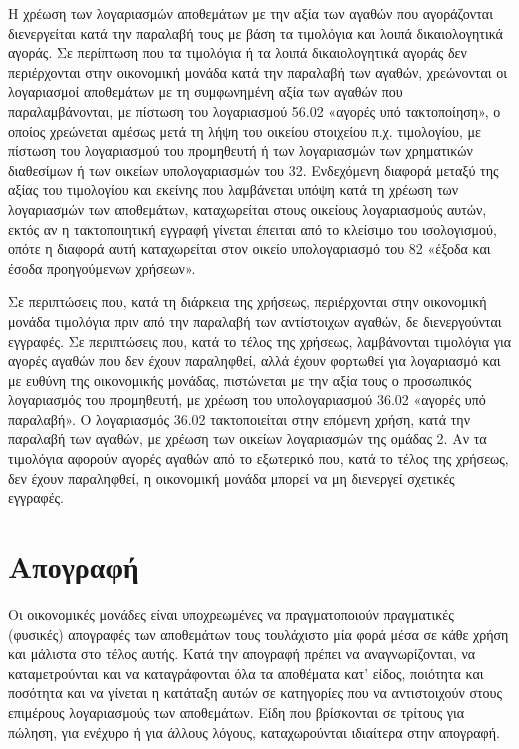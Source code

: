 \documentclass[A4,10pt,greek]{book}
\begin{document}
Η χρέωση των λογαριασμών αποθεμάτων με την αξία των αγαθών που αγοράζονται διενεργείται κατά την παραλαβή τους με βάση τα τιμολόγια και λοιπά δικαιολογητικά αγοράς. Σε περίπτωση που τα τιμολόγια ή τα λοιπά δικαιολογητικά αγοράς δεν περιέρχονται στην οικονομική μονάδα κατά την παραλαβή των αγαθών, χρεώνονται οι λογαριασμοί αποθεμάτων με τη συμφωνημένη αξία των αγαθών που παραλαμβάνονται, με πίστωση του λογαριασμού 56.02 «αγορές υπό τακτοποίηση», ο οποίος χρεώνεται αμέσως μετά τη λήψη του οικείου στοιχείου π.χ. τιμολογίου, με πίστωση του λογαριασμού του προμηθευτή ή των λογαριασμών των χρηματικών διαθεσίμων ή των οικείων υπολογαριασμών του 32. Ενδεχόμενη διαφορά μεταξύ της αξίας του τιμολογίου και εκείνης που λαμβάνεται υπόψη κατά τη χρέωση των λογαριασμών των αποθεμάτων, καταχωρείται στους οικείους λογαριασμούς αυτών, εκτός αν η τακτοποιητική εγγραφή γίνεται έπειται από το κλείσιμο του ισολογισμού, οπότε η διαφορά αυτή καταχωρείται στον οικείο υπολογαριασμό του 82 «έξοδα και έσοδα προηγούμενων χρήσεων».

Σε περιπτώσεις που, κατά τη διάρκεια της χρήσεως, περιέρχονται στην οικονομική μονάδα τιμολόγια πριν από την παραλαβή των αντίστοιχων αγαθών, δε διενεργούνται εγγραφές. Σε περιπτώσεις που, κατά το τέλος της χρήσεως, λαμβάνονται τιμολόγια για αγορές αγαθών που δεν έχουν παραληφθεί, αλλά έχουν φορτωθεί για λογαριασμό και με ευθύνη της οικονομικής μονάδας, πιστώνεται με την αξία τους ο προσωπικός λογαριασμός του προμηθευτή, με χρέωση του υπολογαριασμού 36.02 «αγορές υπό παραλαβή». Ο λογαριασμός 36.02 τακτοποιείται στην επόμενη χρήση, κατά την παραλαβή των αγαθών, με χρέωση των οικείων λογαριασμών της ομάδας 2. Αν τα τιμολόγια αφορούν αγορές αγαθών από το εξωτερικό που, κατά το τέλος της χρήσεως, δεν έχουν παραληφθεί, η οικονομική μονάδα μπορεί να μη διενεργεί σχετικές εγγραφές.

\section{Απογραφή}

Οι οικονομικές μονάδες είναι υποχρεωμένες να πραγματοποιούν πραγματικές (φυσικές) απογραφές των αποθεμάτων τους τουλάχιστο μία φορά μέσα σε κάθε χρήση και μάλιστα στο τέλος αυτής. Κατά την απογραφή πρέπει να αναγνωρίζονται, να καταμετρούνται και να καταγράφονται όλα τα αποθέματα κατ' είδος, ποιότητα και ποσότητα και να γίνεται η κατάταξη αυτών σε κατηγορίες που να αντιστοιχούν στους επιμέρους λογαριασμούς των αποθεμάτων. Είδη που βρίσκονται σε τρίτους για πώληση, για ενέχυρο ή για άλλους λόγους, καταχωρούνται ιδιαίτερα στην απογραφή.
\end{document}
